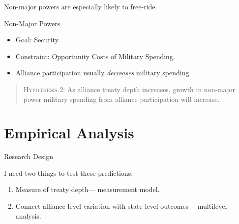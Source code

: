 \documentclass[12pt]{beamer}
\begin{document}

\begin{frame}[standout]

Non-major powers are especially likely to free-ride. 

\end{frame}



\begin{frame}{Non-Major Powers}

\begin{itemize}
\item Goal: Security.
\pause
\item Constraint: Opportunity Costs of Military Spending.  
\pause
\item Alliance participation usually \emph{decreases} military spending. 
\end{itemize} 

\end{frame}


\begin{frame}[standout]

\begin{quote}
\textsc{Hypothesis 2}: As alliance treaty depth increases, growth in non-major power military spending from alliance participation will increase. 
\end{quote} 


\end{frame}


\section{Empirical Analysis} 


\begin{frame}{Research Design}

I need two things to test these predictions: 

\pause 
\begin{enumerate} 
\item Measure of treaty depth--- measurement model. 
\pause
\item Connect alliance-level variation with state-level outcomes--- multilevel analysis.  
\end{enumerate} 


\end{frame}
\end{document}
